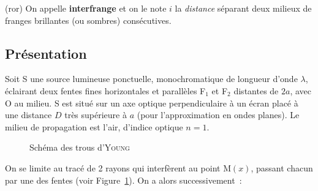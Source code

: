 \documentclass[../../main/main.tex]{subfiles}
\begin{document}
\bigbreak
\begin{tcb}(ror){}
	On appelle \textbf{interfrange} et on le note $i$ la \textit{distance}
	séparant deux milieux de franges brillantes (ou sombres) consécutives.
\end{tcb}

\subsection{Présentation}

Soit S une source lumineuse ponctuelle, monochromatique de longueur d'onde
$\lambda$, éclairant deux fentes fines horizontales et parallèles F$_1$ et F$_2$
distantes de $2a$, avec O au milieu. S est situé sur un axe optique
perpendiculaire à un écran placé à une distance $D$ très supérieure à $a$ (pour
l'approximation en ondes planes). Le milieu de propagation est l'air, d'indice
optique $n=1$.

\begin{figure}[htbp!]
	\centering
	\caption{Schéma des trous d'\textsc{Young}}
	\label{fig:yhole}
\end{figure}

On se limite au tracé de 2 rayons qui interfèrent au point M$(x)$, passant
chacun par une des fentes (voir Figure~\ref{fig:yhole}). On a alors
successivement~:
\end{document}
